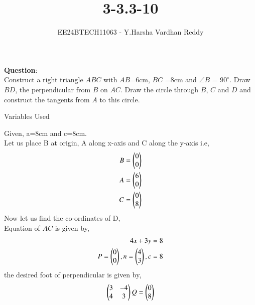 \documentclass[journal]{IEEEtran}
\begin{document}

\vspace{3cm}

\title{3-3.3-10}
\author{EE24BTECH11063 - Y.Harsha Vardhan Reddy
}
{\let\newpage\relax\maketitle}

\renewcommand{\thefigure}{\theenumi}
\renewcommand{\thetable}{\theenumi}
\setlength{\intextsep}{10pt} %


\renewcommand{\thetable}{\theenumi}
\textbf{Question}:\\
Construct a right triangle $ABC$ with $AB$=6cm, $BC$ =8cm and $\angle{B}$ = $90^{\circ}$. Draw $BD$, the perpendicular from $B$ on $AC$. Draw the circle through $B$, $C$ and $D$ and construct the tangents from $A$ to this circle.
\\
\solution
\begin{table}[h!]    
  \centering
  
  \caption{Variables Used}
  \label{tab1-1.2-20}
\end{table}
Given, a=8cm and c=8cm.\\
Let us place B at origin, A along x-axis and C along the y-axis i.e, 
\begin{align}
B = \begin{pmatrix}0\\0\end{pmatrix} \\
A = \begin{pmatrix}6\\0\end{pmatrix} \\
C = \begin{pmatrix}0\\8\end{pmatrix}
\end{align}
Now let us find the co-ordinates of D,\\
Equation of $AC$ is given by,\\
\begin{align}
4x+3y=8\\
    P=\begin{pmatrix}0\\0\end{pmatrix},n=\begin{pmatrix}4\\3\end{pmatrix},c=8\\
\end{align}
the desired foot of perpendicular is given by,
\begin{align}
    \begin{pmatrix}3&-4\\4&3\end{pmatrix}Q=\begin{pmatrix}0\\8\end{pmatrix}
\end{align}
\end{document}
